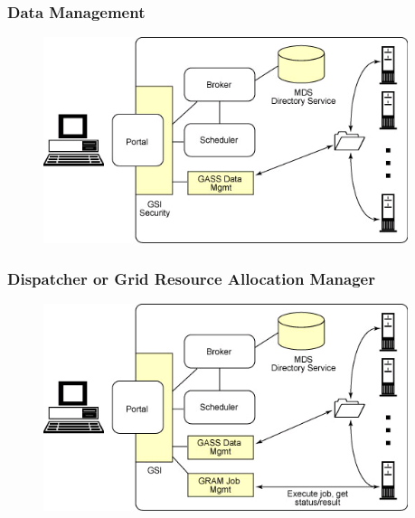 \documentclass{beamer}
\begin{document}
\begin{frame}[label=main2]
 \frametitle{Data Management} 
\begin{figure}[t]
\centering
\includegraphics[width=0.95\textwidth]{imgs/key5}
\end{figure}
\end{frame}

\begin{frame}[label=main2]
 \frametitle{Dispatcher or Grid Resource Allocation Manager} 
\begin{figure}[t]
\centering
\includegraphics[width=0.95\textwidth]{imgs/key6}
\end{figure}
\end{frame}
\end{document}
